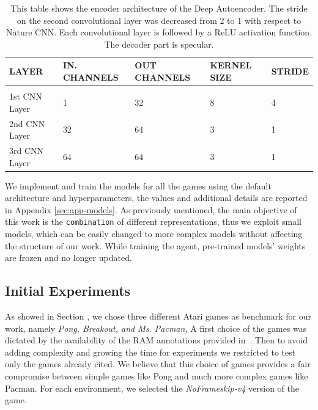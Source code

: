  \begin{table}[htbp]
     \begin{center}
         \begin{tabular}{lllll}
             \multicolumn{1}{l}{LAYER}  &\multicolumn{1}{l}{\bf IN. CHANNELS}  &\multicolumn{1}{l}{\bf OUT CHANNELS}  &\multicolumn{1}{l}{\bf KERNEL SIZE}  &\multicolumn{1}{l}{\bf STRIDE}
             \\ \hline \\
             1st CNN Layer   &  1  & 32 & 8 & 4 \\
             2nd CNN Layer   &  32  & 64 & 3 & 1 \\
             3rd CNN Layer   &  64  & 64 & 3 & 1 \\

         \end{tabular}
     \end{center}
     \caption{This table shows the encoder architecture of the Deep Autoencoder. The stride on the second convolutional layer was decreased from 2 to 1 with respect to Nature CNN. Each convolutional layer is followed by a ReLU activation function. The decoder part is specular.}
     \label{tab:nature_cnn}
 \end{table}


We implement and train the models for all the games using the default architecture and hyperparameters, the values and additional details are reported in Appendix \ref{sec:app-models}.
As previously mentioned, the main objective of this work is the \texttt{combination} of different representations, thus we exploit small models, which can be easily changed to more complex models without affecting the structure of our work.
While training the agent, pre-trained models' weights are frozen and no longer updated.



\subsection{Initial Experiments}\label{sec:init_exp}
As showed in Section , we chose three different Atari games as benchmark for our work, namely \textit{Pong, Breakout, and Ms. Pacman,}
A first choice of the games was dictated by the availability of the RAM annotations provided in~\cite{anand2019unsupervised}.
Then to avoid adding complexity and growing the time for experiments we restricted to test only the games already cited.
We believe that this choice of games provides a fair compromise between simple games like Pong and much more complex games like Pacman.
For each environment, we selected the \textit{NoFrameskip-v4} version of the game.


